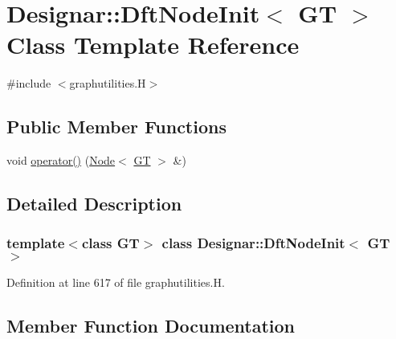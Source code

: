 \hypertarget{class_designar_1_1_dft_node_init}{}\section{Designar\+:\+:Dft\+Node\+Init$<$ GT $>$ Class Template Reference}
\label{class_designar_1_1_dft_node_init}


{\ttfamily \#include $<$graphutilities.\+H$>$}

\subsection*{Public Member Functions}
\begin{DoxyCompactItemize}
\item 
void \hyperlink{class_designar_1_1_dft_node_init_a35335ab986752fee745a7f33ac285d4c}{operator()} (\hyperlink{namespace_designar_a5af326c65aa2bd26b26c410f2030d09e}{Node}$<$ \hyperlink{demo-buildgraph_8_c_a3001c40d2c31ca87ed96cd7d1334a55e}{GT} $>$ \&)
\end{DoxyCompactItemize}


\subsection{Detailed Description}
\subsubsection*{template$<$class GT$>$\newline
class Designar\+::\+Dft\+Node\+Init$<$ G\+T $>$}



Definition at line 617 of file graphutilities.\+H.



\subsection{Member Function Documentation}
\mbox{\label{class_designar_1_1_dft_node_init_a35335ab986752fee745a7f33ac285d4c}} 
